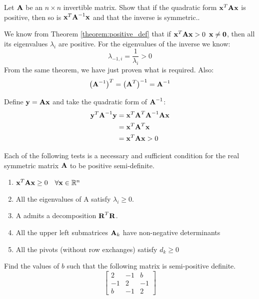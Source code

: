 \documentclass[a4paper]{article}
\numberwithin{equation}{section} %
\newcommand{\setRn}{\mathbb{R}^n} %
\newcommand{\hquad}{\hskip0.5em\relax}%
\newcommand{\B}[1]{\textbf{\textup{#1}}} %
\begin{document}
\begin{exmp}
Let $\B{A}$ be an $n \times n$ invertible matrix. Show that if the quadratic form $\B{x}^{T}\B{Ax}$ is positive, then so is $\B{x}^{T}\B{A}^{-1}\B{x}$ and that the inverse is symmetric..
\end{exmp}
\begin{ASolution}
We know from Theorem \ref{theorem:positive_def} that if $\B{x}^{T}\B{Ax}>0 \hquad \B{x} \neq \B{0}$, then all its eigenvalues $\lambda_i$ are positive. For the eigenvalues of the inverse we know:
\[
\lambda_{-1,i}=\frac{1}{\lambda_i}>0
\]
From the same theorem, we have just proven what is required. Also:
\[
\big( \B{A}^{-1} \big)^{T}=\big( \B{A}^{T} \big)^{-1}=\B{A}^{-1} 
\]

\end{ASolution}
\begin{ASolution}
Define $\B{y}=\B{Ax}$ and take the quadratic form of $\B{A}^{-1}$:
\[
\begin{split}
\B{y}^{T}\B{A}^{-1}\B{y}&=
\B{x}^{T}\B{A}^{T}\B{A}^{-1}\B{A}\B{x}\\
&=\B{x}^{T}\B{A}^{T}\B{x}\\
&=\B{x}^{T}\B{A}\B{x}>0
\end{split}
\]
\end{ASolution}


\begin{shaded*}
\begin{theorem}
Each of the following tests is a necessary and sufficient condition for the real symmetric matrix $\B{A}$ to be positive semi-definite.
\begin{enumerate}
\item $\B{x}^{T}\B{Ax} \geq0 \quad \forall \B{x} \in \setRn$
\item All the eigenvalues of A satisfy $\lambda_i \geq 0$.
\item A admits a decomposition $\B{R}^{T}\B{R}$.
\item All the upper left submatrices $\B{A}_k$ have non-negative determinants
\item All the pivots (without row exchanges) satisfy $d_k \geq 0$
\end{enumerate}
\label{theorem:semi_pos_def}
\end{theorem}
\end{shaded*}

\begin{exmp}
\cite{lec_notes_zwick} Find the values of $b$ such that the following matrix is semi-positive definite.
\[
\begin{bmatrix}
2 & -1 & b\\-1 & 2 & -1\\b & -1 & 2
\end{bmatrix}
\]
\end{exmp}
\end{document}
